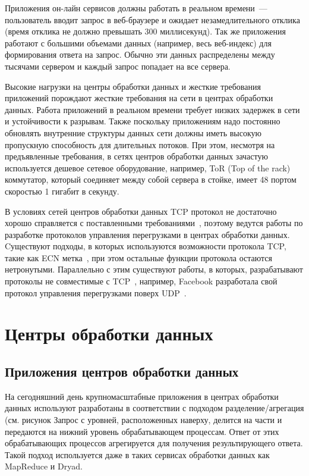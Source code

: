 \documentclass[14pt, a4paper,oneside]{extarticle}
\begin{document}
Приложения он-лайн сервисов должны работать в реальном времени~--- пользователь вводит запрос в веб-браузере и ожидает незамедлительного отклика (время отклика не должно превышать 300 миллисекунд). 
Так же приложения работают с большими объемами данных (например, весь веб-индекс) для формирования ответа на запрос. Обычно эти данных распределены между тысячами сервером и каждый запрос попадает на все сервера.

Высокие нагрузки на центры обработки данных и жесткие требования приложений порождают жесткие требования на сети в центрах обработки данных. Работа приложений в реальном времени требует низких задержек в сети и устойчивости к разрывам. Также поскольку приложениям надо постоянно обновлять внутренние структуры данных сети должны иметь высокую пропускную способность для длительных потоков. При этом, несмотря на предъявленные требования, в сетях центров обработки данных зачастую используется дешевое сетевое оборудование, например, ToR (Top of the rack) коммутатор, который соединяет между собой сервера в стойке, имеет 48 портом скоростью 1 гигабит в секунду.

В условиях сетей центров обработки данных TCP протокол не достаточно хорошо справляется с поставленными требованиями~\cite{dctcp}, поэтому ведутся работы по разработке протоколов управления перегрузками в центрах обработки данных.
Cуществуют подходы, в которых используются возможности протокола TCP, такие как ECN метка~\cite{dctp, d2tcp}, при этом остальные функции протокола остаются нетронутыми.
Параллельно с этим существуют работы, в которых, разрабатывают протоколы не совместимые с TCP~\cite{d3tcp}, например, Facebook разработала свой протокол управления перегрузками поверх UDP~\cite{facebook}.

\newpage

\section{Центры обработки данных}
\subsection{Приложения центров обработки данных}

На сегодняшний день крупномасштабные приложения в центрах обработки данных используют разработаны в соответствии с подходом разделение/агрегация (см. рисунок %
Запрос с уровней, расположенных наверху, делится на части и передаются на нижний уровень обрабатывающем процессам. Ответ от этих обрабатывающих процессов агрегируется для получения результирующего ответа. Такой подход используется даже в таких сервисах обработки данных как MapReduce и  Dryad. %
\end{document}
